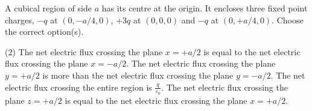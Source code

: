
\item A cubical region of side \( a \) has its centre at the origin. It encloses three fixed point charges, \( -q \) at \( (0, -a/4, 0) \), \( +3q \) at \( (0,0,0) \) and \( -q \) at \( (0,+a/4,0) \). Choose the correct option(s).
    \begin{center}
    \end{center}
    \begin{tasks}(2)
        \task The net electric flux crossing the plane \( x = +a/2 \) is equal to the net electric flux crossing the plane \( x = -a/2 \).
        \task The net electric flux crossing the plane \( y = +a/2 \) is more than the net electric flux crossing the plane \( y = -a/2 \).
        \task The net electric flux crossing the entire region is \( \frac{q}{\varepsilon_0} \).
        \task The net electric flux crossing the plane \( z = +a/2 \) is equal to the net electric flux crossing the plane \( x = +a/2 \).
    \end{tasks}
